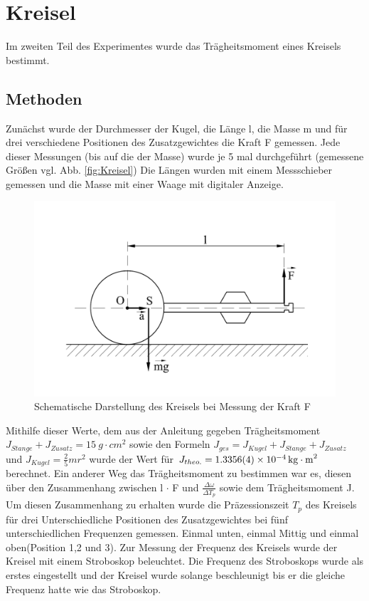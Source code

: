 \section{Kreisel}
Im zweiten Teil des Experimentes wurde das Trägheitsmoment eines Kreisels bestimmt.
\subsection{Methoden}\label{kap:KreiselMethoden}
Zunächst wurde der Durchmesser der Kugel, die Länge l, die Masse m und für drei verschiedene Positionen des Zusatzgewichtes die Kraft F gemessen.
Jede dieser Messungen (bis auf die der Masse) wurde je 5 mal durchgeführt (gemessene Größen vgl. Abb. \ref{fig:Kreisel})
Die Längen  wurden mit einem Messschieber gemessen und die Masse mit einer Waage mit digitaler Anzeige.
\begin{figure}[h]
	\centering
	\includegraphics[width=0.7\linewidth]{res/KreiselAufbau.pdf}
	\caption{Schematische Darstellung des Kreisels bei Messung der Kraft F\cite{lw}}
	\label{fig:kreisel}
\end{figure}
Mithilfe dieser Werte, dem aus der Anleitung gegeben Trägheitsmoment $J_{Stange}+J_{Zusatz}=\SI{15}{g \cdot cm^2}$ sowie den Formeln $J_{ges}=J_{Kugel}+J_{Stange}+J_{Zusatz}$ und $J_{Kugel}=\frac{2}{5}mr^2$ wurde der %
Wert für $J_{theo.}=\SI{1,3356+-0,0004e-4}{kg \cdot m^2}$ berechnet. Ein anderer Weg das Trägheitsmoment zu bestimmen war es, diesen über den Zusammenhang zwischen l $\cdot$ F und  $\frac{\Delta \omega}{\Delta T_p}$ sowie dem Trägheitsmoment J. Um diesen Zusammenhang zu erhalten wurde die Präzessionszeit $T_p$ des Kreisels für drei Unterschiedliche Positionen des Zusatzgewichtes bei fünf unterschiedlichen Frequenzen gemessen. Einmal unten, einmal Mittig und einmal oben(Position 1,2 und 3). Zur Messung der Frequenz des Kreisels wurde der Kreisel mit einem Stroboskop beleuchtet. Die Frequenz des Stroboskops wurde als erstes eingestellt und der Kreisel wurde solange beschleunigt bis er die gleiche Frequenz hatte wie das Stroboskop.
